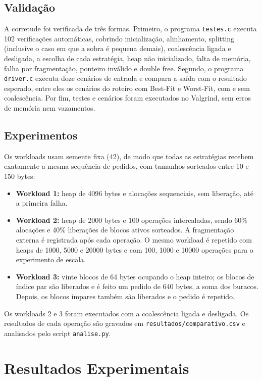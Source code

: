\subsection{Validação}

A corretude foi verificada de três formas. Primeiro, o programa
\texttt{testes.c} executa 102 verificações automáticas, cobrindo inicialização,
alinhamento, splitting (inclusive o caso em que a sobra é pequena demais),
coalescência ligada e desligada, a escolha de cada estratégia, heap não
inicializado, falta de memória, falha por fragmentação, ponteiro inválido e
double free. Segundo, o programa \texttt{driver.c} executa doze cenários de
entrada e compara a saída com o resultado esperado, entre eles os cenários do
roteiro com Best-Fit e Worst-Fit, com e sem coalescência. Por fim, testes e
cenários foram executados no Valgrind, sem erros de memória nem vazamentos.

\subsection{Experimentos}\label{sec:experimentos}

Os workloads usam semente fixa (42), de modo que todas as estratégias recebem
exatamente a mesma sequência de pedidos, com tamanhos sorteados entre 10 e 150
bytes:

\begin{itemize}
    \item \textbf{Workload 1:} heap de 4096 bytes e alocações sequenciais, sem liberação, até a primeira falha.
    \item \textbf{Workload 2:} heap de 2000 bytes e 100 operações intercaladas, sendo 60\% alocações e 40\% liberações de blocos ativos sorteados. A fragmentação externa é registrada após cada operação. O mesmo workload é repetido com heaps de 1000, 5000 e 20000 bytes e com 100, 1000 e 10000 operações para o experimento de escala.
    \item \textbf{Workload 3:} vinte blocos de 64 bytes ocupando o heap inteiro; os blocos de índice par são liberados e é feito um pedido de 640 bytes, a soma dos buracos. Depois, os blocos ímpares também são liberados e o pedido é repetido.
\end{itemize}

Os workloads 2 e 3 foram executados com a coalescência ligada e desligada. Os
resultados de cada operação são gravados em \texttt{resultados/comparativo.csv}
e analisados pelo script \texttt{analise.py}.


\section{Resultados Experimentais}

